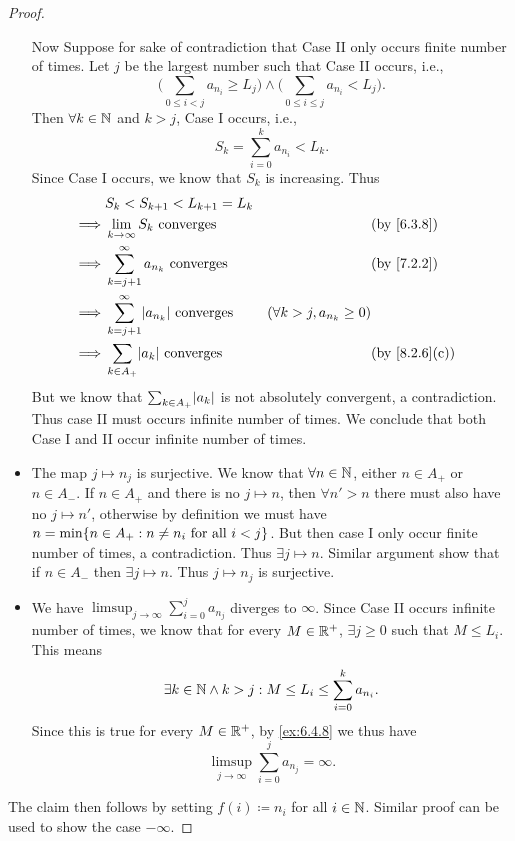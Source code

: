 \begin{proof}
\begin{itemize}
		      Now Suppose for sake of contradiction that Case II only occurs finite number of times.
		      Let \(j\) be the largest number such that Case II occurs, i.e.,
		      \[
			      \Bigg(\sum_{0 \leq i < j} a_{n_i} \geq L_j\Bigg) \land \Bigg(\sum_{0 \leq i \leq j} a_{n_i} < L_j\Bigg).
		      \]
		      Then \(\forall k \in \mathbb{N}\) and \(k > j\), Case I occurs, i.e.,
		      \[
			      S_k = \sum_{i = 0}^k a_{n_i} < L_k.
		      \]
		      Since Case I occurs, we know that \(S_k\) is increasing.
		      Thus
		      \begin{align*}
			               & S_k < S_{k + 1} < L_{k + 1} = L_k                                                                                       \\
			      \implies & \lim_{k \to \infty} S_k \text{ converges}               &                                 & \by{6.3.8}                  \\
			      \implies & \sum_{k = j + 1}^\infty a_{n_k} \text{ converges}       &                                 & \by{7.2.2}                  \\
			      \implies & \sum_{k = j + 1}^\infty \abs{a_{n_k}} \text{ converges} & (\forall k > j, a_{n_k} \geq 0)                               \\
			      \implies & \sum_{k \in A_+} \abs{a_k} \text{ converges}            &                                 & \text{(by \cref{8.2.6}(c))}
		      \end{align*}
		      But we know that \(\sum_{k \in A_+} \abs{a_k}\) is not absolutely convergent, a contradiction.
		      Thus case II must occurs infinite number of times.
		      We conclude that both Case I and II occur infinite number of times.
		\item The map \(j \mapsto n_j\) is surjective.
		      We know that \(\forall n \in \mathbb{N}\), either \(n \in A_+\) or \(n \in A_-\).
		      If \(n \in A_+\) and there is no \(j \mapsto n\), then \(\forall n' > n\) there must also have no \(j \mapsto n'\), otherwise by definition we must have \(n = \min\set{n \in A_+ : n \neq n_i \text{ for all } i < j}\).
		      But then case I only occur finite number of times, a contradiction.
		      Thus \(\exists j \mapsto n\).
		      Similar argument show that if \(n \in A_-\) then \(\exists j \mapsto n\).
		      Thus \(j \mapsto n_j\) is surjective.
		\item We have \(\limsup_{j \to \infty} \sum_{i = 0}^j a_{n_j}\) diverges to \(\infty\).
		      Since Case II occurs infinite number of times, we know that for every \(M \in \mathbb{R}^+\), \(\exists j \geq 0\) such that \(M \leq L_i\).
		      This means
		      \[
			      \exists k \in \mathbb{N} \land k > j : M \leq L_i \leq \sum_{i = 0}^k a_{n_i}.
		      \]
		      Since this is true for every \(M \in \mathbb{R}^+\), by \cref{ex:6.4.8} we thus have
		      \[
			      \limsup_{j \to \infty} \sum_{i = 0}^j a_{n_j} = \infty.
		      \]
	\end{itemize}
	The claim then follows by setting \(f(i) \coloneqq n_i\) for all \(i \in \mathbb{N}\).
	Similar proof can be used to show the case \(-\infty\).
\end{proof}